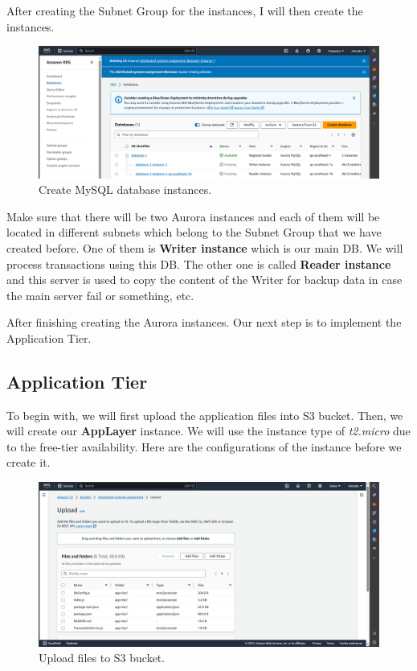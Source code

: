 \documentclass{article}
\begin{document}
After creating the Subnet Group for the instances, I will then create the instances.\par 
\begin{figure}[h]
    \centering
    \includegraphics[width=12cm]{Pictures/Database/DB_create.png}
    \caption{Create MySQL database instances.}
    \label{fig:enter-label}
\end{figure}

Make sure that there will be two Aurora instances and each of them will be located in different subnets which belong to the Subnet Group that we have created before. One of them is \textbf{Writer instance} which is our main DB. We will process transactions using this DB. The other one is called \textbf{Reader instance} and this server is used to copy the content of the Writer for backup data in case the main server fail or something, etc.\par

After finishing creating the Aurora instances. Our next step is to implement the Application Tier.\par

\newpage
\subsection{Application Tier}
To begin with, we will first upload the application files into S3 bucket. Then, we will create our \textbf{AppLayer} instance. We will use the instance type of \textit{t2.micro} due to the free-tier availability. Here are the configurations of the instance before we create it.\par
\begin{figure}[h]
    \centering
    \includegraphics[width=12cm]{Pictures/App-tier/Upload_S3.png}
    \caption{Upload files to S3 bucket.}
    \label{fig:enter-label}
\end{figure}
\end{document}

